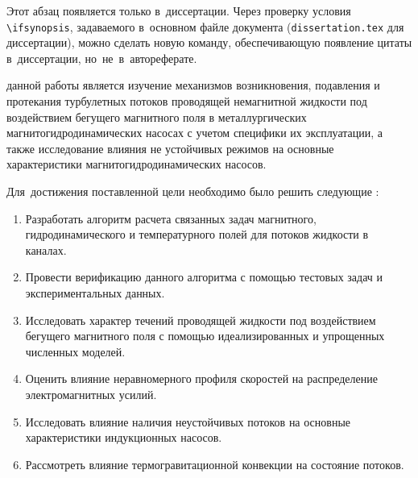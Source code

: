 
{\actuality} 
\else
Этот абзац появляется только в~диссертации.
Через проверку условия \verb!\!\verb!ifsynopsis!, задаваемого в~основном файле
документа (\verb!dissertation.tex! для диссертации), можно сделать новую
команду, обеспечивающую появление цитаты в~диссертации, но~не~в~автореферате.
\fi

{\aim} данной работы является изучение механизмов возникновения, подавления и протекания турбулетных потоков проводящей немагнитной жидкости под воздействием бегущего магнитного поля в металлургических магнитогидродинамических насосах с учетом специфики их эксплуатации, а также исследование влияния не устойчивых режимов на основные характеристики магнитогидродинамических насосов.

Для~достижения поставленной цели необходимо было решить следующие {\tasks}:
\begin{enumerate}[beginpenalty=10000] %
  \item Разработать алгоритм расчета связанных задач магнитного, гидродинамического и температурного полей для потоков жидкости в каналах.
  \item Провести верификацию данного алгоритма с помощью тестовых задач и экспериментальных данных.
  \item Исследовать характер течений проводящей жидкости под воздействием бегущего магнитного поля с помощью идеализированных и упрощенных численных моделей. 
  \item Оценить влияние неравномерного профиля скоростей на распределение  электромагнитных усилий. 
  \item Исследовать влияние наличия неустойчивых потоков на основные характеристики индукционных насосов.
  \item Рассмотреть влияние термогравитационной конвекции на состояние потоков.  
\end{enumerate}


